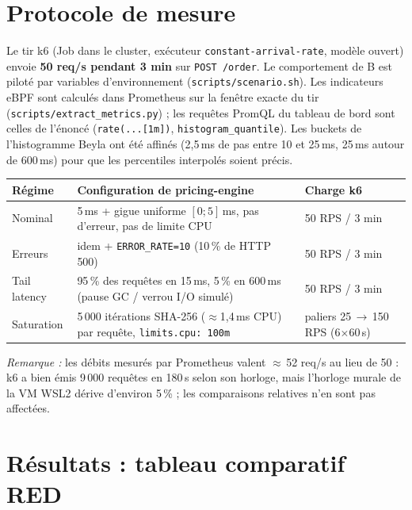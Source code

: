 \documentclass[10pt,a4paper]{article}
\newcommand{\code}[1]{\texttt{\small #1}}
\begin{document}
\section{Protocole de mesure}

Le tir k6 (Job dans le cluster, exécuteur \code{constant-arrival-rate}, modèle ouvert) envoie \textbf{50 req/s pendant 3 min} sur \code{POST /order}. Le comportement de B est piloté par variables d'environnement (\code{scripts/scenario.sh}). Les indicateurs eBPF sont calculés dans Prometheus sur la fenêtre exacte du tir (\code{scripts/extract\_metrics.py}) ; les requêtes PromQL du tableau de bord sont celles de l'énoncé (\code{rate(...[1m])}, \code{histogram\_quantile}). Les buckets de l'histogramme Beyla ont été affinés (2,5\,ms de pas entre 10 et 25\,ms, 25\,ms autour de 600\,ms) pour que les percentiles interpolés soient précis.

\begin{table}[H]\centering\small
\begin{tabularx}{\linewidth}{@{}l X l@{}}
\toprule
\textbf{Régime} & \textbf{Configuration de pricing-engine} & \textbf{Charge k6} \\ \midrule
Nominal     & 5\,ms + gigue uniforme $[0;5]$\,ms, pas d'erreur, pas de limite CPU & 50 RPS / 3 min \\
Erreurs     & idem + \code{ERROR\_RATE=10} (10\,\% de HTTP 500) & 50 RPS / 3 min \\
Tail latency& 95\,\% des requêtes en 15\,ms, 5\,\% en 600\,ms (pause GC / verrou I/O simulé) & 50 RPS / 3 min \\
Saturation  & 5\,000 itérations SHA-256 ($\approx$1,4\,ms CPU) par requête, \code{limits.cpu: 100m} & paliers 25\,$\rightarrow$\,150 RPS (6$\times$60\,s) \\
\bottomrule
\end{tabularx}
\end{table}

\emph{Remarque :} les débits mesurés par Prometheus valent $\approx$\,52 req/s au lieu de 50 : k6 a bien émis 9\,000 requêtes en 180\,s selon son horloge, mais l'horloge murale de la VM WSL2 dérive d'environ 5\,\% ; les comparaisons relatives n'en sont pas affectées.

\section{Résultats : tableau comparatif RED}
\end{document}
